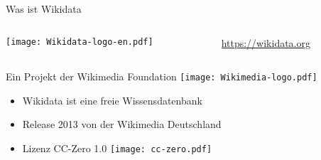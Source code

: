\documentclass{beamer}
\begin{document}
\begin{frame}{Was ist Wikidata}

      \vspace{-0.5cm}
  \begin{columns}[c]
    \begin{column}[T]{.4\textwidth}
      \begin{center}
        \texttt{[image: Wikidata-logo-en.pdf]}
      \end{center}
    \end{column}
    \begin{column}[T]{.6\textwidth}
      \vspace{1.5cm}
      \Large{\url{https://wikidata.org}}
    \end{column}
  \end{columns}

      \vspace{0.5cm}
  Ein Projekt der Wikimedia Foundation \texttt{[image: Wikimedia-logo.pdf]}

\begin{itemize}
  \item Wikidata ist eine freie Wissensdatenbank
  \item Release 2013 von der Wikimedia Deutschland
  \item Lizenz CC-Zero 1.0 \texttt{[image: cc-zero.pdf]}%
\end{itemize}

\end{frame}
\end{document}
